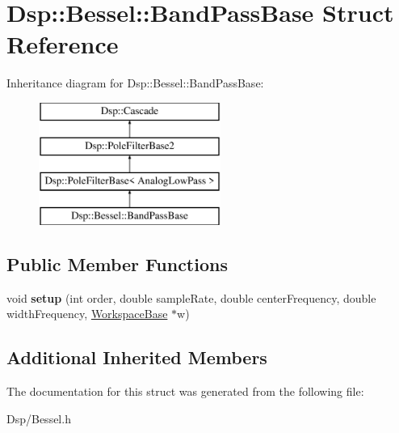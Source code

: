 \hypertarget{structDsp_1_1Bessel_1_1BandPassBase}{\section{Dsp\-:\-:Bessel\-:\-:Band\-Pass\-Base Struct Reference}
\label{structDsp_1_1Bessel_1_1BandPassBase}
}
Inheritance diagram for Dsp\-:\-:Bessel\-:\-:Band\-Pass\-Base\-:\begin{figure}[H]
\begin{center}
\leavevmode
\includegraphics[height=4.000000cm]{structDsp_1_1Bessel_1_1BandPassBase}
\end{center}
\end{figure}
\subsection*{Public Member Functions}
\begin{DoxyCompactItemize}
\item 
\hypertarget{structDsp_1_1Bessel_1_1BandPassBase_a5fe677ce355cb26134ff67dfc09fef6a}{void {\bfseries setup} (int order, double sample\-Rate, double center\-Frequency, double width\-Frequency, \hyperlink{structDsp_1_1Bessel_1_1WorkspaceBase}{Workspace\-Base} $\ast$w)}\label{structDsp_1_1Bessel_1_1BandPassBase_a5fe677ce355cb26134ff67dfc09fef6a}

\end{DoxyCompactItemize}
\subsection*{Additional Inherited Members}


The documentation for this struct was generated from the following file\-:\begin{DoxyCompactItemize}
\item 
Dsp/Bessel.\-h\end{DoxyCompactItemize}
